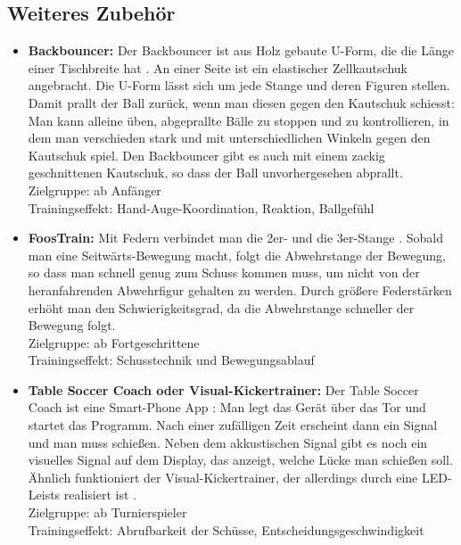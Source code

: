 \subsection{Weiteres Zubehör}
\label{tisch:zubehoer:training:weiteres}

\begin{itemize}
\item {\bf Backbouncer:}
Der Backbouncer ist aus Holz gebaute U-Form, die die Länge einer Tischbreite hat \citep{www:kickertrainer}.
An einer Seite ist ein elastischer Zellkautschuk angebracht.
Die U-Form lässt sich um jede Stange und deren Figuren stellen. 
Damit prallt der Ball zurück, wenn man diesen gegen den Kautschuk schiesst: 
Man kann alleine üben, abgeprallte Bälle zu stoppen und zu kontrollieren, in dem man verschieden stark und mit unterschiedlichen Winkeln gegen den Kautschuk spiel. 
Den Backbouncer gibt es auch mit einem zackig geschnittenen Kautschuk, so dass der Ball unvorhergesehen abprallt.  
\\
Zielgruppe: ab Anfänger 
\\
Trainingseffekt: Hand-Auge-Koordination, Reaktion, Ballgefühl
\item {\bf FoosTrain:}
Mit Federn verbindet man die 2er- und die 3er-Stange \citep{www:foostrain}.
Sobald man eine Seitwärts-Bewegung macht, folgt die Abwehrstange der Bewegung, so dass man schnell genug zum Schuss kommen muss, um nicht von der heranfahrenden Abwehrfigur gehalten zu werden.
Durch größere Federstärken erhöht man den Schwierigkeitsgrad, da die Abwehrstange schneller der Bewegung folgt.
\\
Zielgruppe: ab Fortgeschrittene
\\
Trainingseffekt: Schusstechnik und Bewegungsablauf 
\item {\bf Table Soccer Coach oder Visual-Kickertrainer:}
Der Table Soccer Coach ist eine Smart-Phone App \citep{www:tablesoccercoach}:
Man legt das Gerät über das Tor und startet das Programm. 
Nach einer zufälligen Zeit erscheint dann ein Signal und man muss schießen.
Neben dem akkustischen Signal gibt es noch ein visuelles Signal auf dem Display, das anzeigt, welche Lücke man schießen soll.
Ähnlich funktioniert der Visual-Kickertrainer, der allerdings durch eine LED-Leists realisiert ist \citep{www:visualkickertrainer}.
\\
Zielgruppe: ab Turnierspieler 
\\
Trainingseffekt: Abrufbarkeit der Schüsse, Entscheidungsgeschwindigkeit

\end{itemize}
